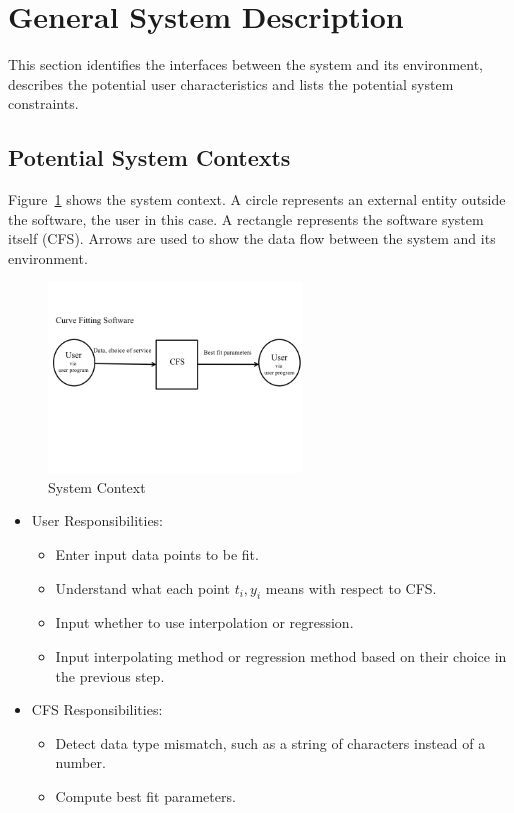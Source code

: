 \documentclass[12pt]{article}
\newcommand{\famname}{CFS} %
\begin{document}
\section{General System Description}

This section identifies the interfaces between the system and its environment,
describes the potential user characteristics and lists the potential system
constraints.

\subsection{Potential System Contexts}

Figure~\ref{Fig_SystemContext} shows the system context.  A circle represents an
external entity outside the software, the user in this case.  A rectangle
represents the software system itself (\famname{}).  Arrows are used to show
the data
flow between the system and its environment.

\begin{figure}[h!]
	\begin{center}
		\includegraphics[width=0.6\textwidth]{SystemContextFigure}
		\caption{System Context}
		\label{Fig_SystemContext} 
	\end{center}
\end{figure}
\begin{itemize}
\item User Responsibilities:
\begin{itemize}
\item Enter input data points to be fit.
\item Understand what each point $t_i, y_i$ means with respect to \famname{}.
\item Input whether to use interpolation or regression.
\item Input interpolating method or regression method based on their choice in the previous step. 
\end{itemize}
\item \famname{} Responsibilities:
\begin{itemize}
\item Detect data type mismatch, such as a string of characters instead of a number.
\item Compute best fit parameters.
\end{itemize}
\end{itemize}
\end{document}
